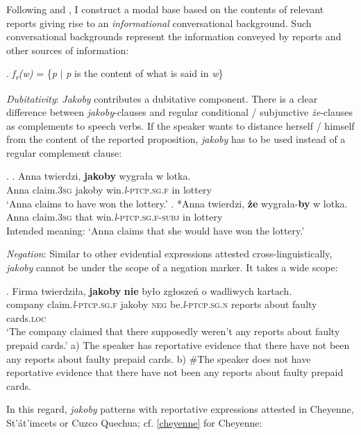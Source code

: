 \documentclass[output=paper
,modfonts
,nonflat]{langsci/langscibook}
\newcommand{\glossformat}[1]{\textsc{#1}}
\newcommand{\thirdperson}{\glossformat{3}\xspace}
\newcommand{\fem}{\glossformat{f}\xspace}
\newcommand{\loc}{\glossformat{loc}\xspace}
\newcommand{\negation}{\glossformat{neg}\xspace}
\newcommand{\lptcp}{\emph{l}\glossformat{-ptcp}\xspace}
\newcommand{\n}{\glossformat{n}\xspace}
\newcommand{\sg}{\glossformat{sg}\xspace}
\newcommand{\subj}{\glossformat{subj}\xspace}
\begin{document}
Following \textcite{Kratzer2012} and \textcite{Faller2011}, I construct a modal base based on the contents of relevant reports giving rise to an \emph{informational} conversational background. Such conversational backgrounds represent the information conveyed by reports and other sources of information:

\ex.	  \emph{f\textsubscript{r}(w)} = \{\emph{p} $ \mid $ \emph{p} is the content of what is said in \emph{w}\}
 
 \emph{Dubitativity}: \emph{Jakoby} contributes a dubitative component. There is a clear difference between \emph{jakoby}-clauses and regular conditional / subjunctive \emph{że}-clauses as complements to speech verbs. If the speaker wants to distance herself / himself from the content of the reported proposition, \emph{jakoby} has to be used instead of a regular complement clause: 

\ex.	\ag.	Anna twierdzi, \textbf{jakoby} wygrała w lotka. \\
		Anna claim.{\thirdperson}{\sg} jakoby win.{\lptcp}.{\sg}.{\fem} in lottery \\
		`Anna claims to have won the lottery.'
	\bg.	*Anna twierdzi, \textbf{że} wygrała-\textbf{by} w lotka. \\  
		Anna claim.{\thirdperson}{\sg} that win.{\lptcp}.{\sg}.{\fem}-{\subj} in lottery \\
		Intended meaning: `Anna claims that she would have won the lottery.' 
		
\emph{Negation}: Similar to other evidential expressions attested cross-linguistically, \emph{jakoby} cannot be under the scope of a negation marker. It takes a wide scope: 

\exg.		Firma twierdziła, \textbf{jakoby} \textbf{nie} było zgłoszeń o wadliwych kartach. \\
		company claim.{\lptcp}.{\sg}.{\fem} jakoby {\negation} be.{\lptcp}.{\sg}.{\n} reports about faulty cards.{\loc} \\
		`The company claimed that there supposedly weren't any reports about faulty prepaid cards.' \newline
		a) The speaker has reportative evidence that there have not been any reports about faulty prepaid cards. \newline
		b) \#The speaker does not have reportative evidence that there have not been any reports about faulty prepaid cards.

In this regard, \emph{jakoby} patterns with reportative expressions attested in Cheyenne, St'át'imcets or Cuzco Quechua; cf. \ref{cheyenne} for Cheyenne:
\end{document}
